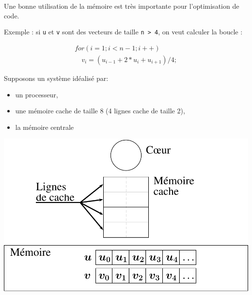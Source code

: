\documentclass{beamer}
\begin{document}
\begin{frame}[fragile]
	Une bonne utilisation de la mémoire est très importante pour l'optimisation de code.
	\bigskip

	Exemple : si \verb|u| et \verb|v| sont des vecteurs de taille \verb|n > 4|, on veut calculer la boucle :

\begin{equation}
\begin{array}{l}
for (i=1; i<n-1; i++) \\
\quad  v_i = (u_{i-1} + 2*u_{i} + u_{i+1})/4;
\end{array}
\end{equation}

\end{frame}

\begin{frame}
	Supposons un système idéalisé par: 
	\begin{itemize}
		\item un processeur, 
		\item une mémoire cache de taille 8 (4 lignes cache de taille 2),
		\item la mémoire centrale
	\end{itemize}
	\begin{center}
	\includegraphics[scale=0.5]{../../Images/sequentiel}
   \end{center}
\end{frame}
\end{document}
